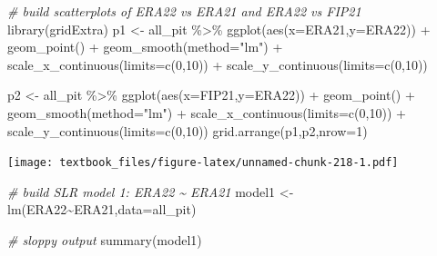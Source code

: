 \documentclass[
  11pt,
]{book}
\newenvironment{Shaded}{\begin{snugshade}}{\end{snugshade}}
\newcommand{\AttributeTok}[1]{\textcolor[rgb]{0.77,0.63,0.00}{#1}}
\newcommand{\CommentTok}[1]{\textcolor[rgb]{0.56,0.35,0.01}{\textit{#1}}}
\newcommand{\DecValTok}[1]{\textcolor[rgb]{0.00,0.00,0.81}{#1}}
\newcommand{\FunctionTok}[1]{\textcolor[rgb]{0.00,0.00,0.00}{#1}}
\newcommand{\NormalTok}[1]{#1}
\newcommand{\OtherTok}[1]{\textcolor[rgb]{0.56,0.35,0.01}{#1}}
\newcommand{\SpecialCharTok}[1]{\textcolor[rgb]{0.00,0.00,0.00}{#1}}
\newcommand{\StringTok}[1]{\textcolor[rgb]{0.31,0.60,0.02}{#1}}
\theoremstyle{definition}
\theoremstyle{definition}
\theoremstyle{definition}
\theoremstyle{definition}
\theoremstyle{remark}
\begin{document}
\begin{Shaded}
\begin{Highlighting}[]
\CommentTok{\# build scatterplots of ERA22 vs ERA21 and ERA22 vs FIP21}
\FunctionTok{library}\NormalTok{(gridExtra)}
\NormalTok{p1 }\OtherTok{\textless{}{-}}\NormalTok{ all\_pit }\SpecialCharTok{\%\textgreater{}\%} \FunctionTok{ggplot}\NormalTok{(}\FunctionTok{aes}\NormalTok{(}\AttributeTok{x=}\NormalTok{ERA21,}\AttributeTok{y=}\NormalTok{ERA22)) }\SpecialCharTok{+}
  \FunctionTok{geom\_point}\NormalTok{() }\SpecialCharTok{+}
  \FunctionTok{geom\_smooth}\NormalTok{(}\AttributeTok{method=}\StringTok{"lm"}\NormalTok{) }\SpecialCharTok{+}
  \FunctionTok{scale\_x\_continuous}\NormalTok{(}\AttributeTok{limits=}\FunctionTok{c}\NormalTok{(}\DecValTok{0}\NormalTok{,}\DecValTok{10}\NormalTok{)) }\SpecialCharTok{+}
  \FunctionTok{scale\_y\_continuous}\NormalTok{(}\AttributeTok{limits=}\FunctionTok{c}\NormalTok{(}\DecValTok{0}\NormalTok{,}\DecValTok{10}\NormalTok{))}

\NormalTok{p2 }\OtherTok{\textless{}{-}}\NormalTok{ all\_pit }\SpecialCharTok{\%\textgreater{}\%} \FunctionTok{ggplot}\NormalTok{(}\FunctionTok{aes}\NormalTok{(}\AttributeTok{x=}\NormalTok{FIP21,}\AttributeTok{y=}\NormalTok{ERA22)) }\SpecialCharTok{+}
  \FunctionTok{geom\_point}\NormalTok{() }\SpecialCharTok{+}
  \FunctionTok{geom\_smooth}\NormalTok{(}\AttributeTok{method=}\StringTok{"lm"}\NormalTok{) }\SpecialCharTok{+}
  \FunctionTok{scale\_x\_continuous}\NormalTok{(}\AttributeTok{limits=}\FunctionTok{c}\NormalTok{(}\DecValTok{0}\NormalTok{,}\DecValTok{10}\NormalTok{)) }\SpecialCharTok{+}
  \FunctionTok{scale\_y\_continuous}\NormalTok{(}\AttributeTok{limits=}\FunctionTok{c}\NormalTok{(}\DecValTok{0}\NormalTok{,}\DecValTok{10}\NormalTok{))}
\FunctionTok{grid.arrange}\NormalTok{(p1,p2,}\AttributeTok{nrow=}\DecValTok{1}\NormalTok{)}
\end{Highlighting}
\end{Shaded}

\texttt{[image: textbook\_files/figure-latex/unnamed-chunk-218-1.pdf]}

\newpage

\begin{Shaded}
\begin{Highlighting}[]
\CommentTok{\# build SLR model 1: ERA22 \textasciitilde{} ERA21}
\NormalTok{model1 }\OtherTok{\textless{}{-}} \FunctionTok{lm}\NormalTok{(ERA22}\SpecialCharTok{\textasciitilde{}}\NormalTok{ERA21,}\AttributeTok{data=}\NormalTok{all\_pit)}

\CommentTok{\# sloppy output}
\FunctionTok{summary}\NormalTok{(model1)}
\end{Highlighting}
\end{Shaded}
\end{document}
